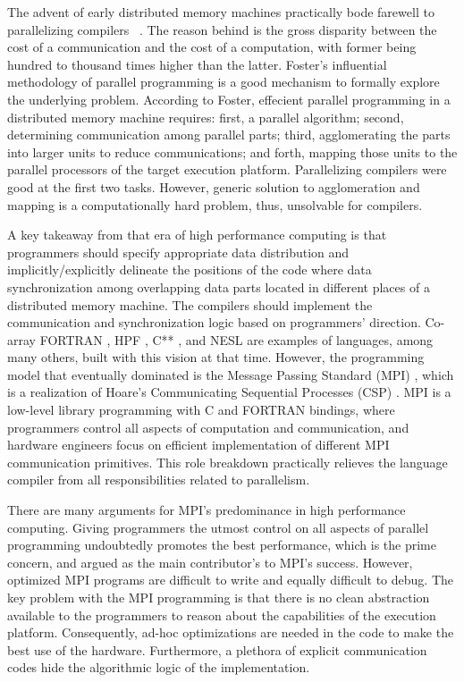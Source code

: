 \documentclass[ASNA,twocolumn]{USG} %
\begin{document}
{The advent of early distributed memory machines practically bode farewell to parallelizing compilers ~\citep{10.1145/1238844.1238851}. The reason behind is the gross disparity between the cost of a communication and the cost of a computation, with former being hundred to thousand times higher than the latter. Foster's influential methodology of parallel programming \citep{Foster:1995:DBP:527029} is a good mechanism to formally explore the underlying problem. According to Foster, effecient parallel programming in a distributed memory machine requires: first, a parallel algorithm; second, determining communication among parallel parts; third, agglomerating the parts into larger units to reduce communications; and forth, mapping those units to the parallel processors of the target execution platform. Parallelizing compilers were good at the first two tasks. However, generic solution to agglomeration and mapping is a computationally hard problem, thus, unsolvable for compilers.  
	
A key takeaway from that era of high performance computing is that programmers should specify appropriate data distribution and implicitly/explicitly delineate the positions of the code where data synchronization among overlapping data parts located in different places of a distributed memory machine. The compilers should implement the communication and synchronization logic based on programmers' direction. Co-array FORTRAN \citep{10.1145/289918.289920}, HPF \citep{219857} \citep{MEHROTRA1998325}, C** \citep{10.1007/3-540-57502-2_56}, and NESL \citep{10.5555/865114} are examples of languages, among many others, built with this vision at that time. However, the programming model that eventually dominated is the Message Passing Standard (MPI) \citep{10.1007/978-3-0348-8534-8_21}, which is a realization of Hoare's Communicating Sequential Processes (CSP) \citep{10.1145/359576.359585}. MPI is a low-level library programming with C and FORTRAN bindings, where programmers control all aspects of computation and communication, and hardware engineers focus on efficient implementation of different MPI communication primitives. This role breakdown practically relieves the language compiler from all responsibilities related to parallelism. 
	
There are many arguments for MPI's predominance in high performance computing. Giving programmers the utmost control on all aspects of parallel programming undoubtedly promotes the best performance, which is the prime concern, and argued as the main contributor's to MPI's success. However, optimized MPI programs are difficult to write and equally difficult to debug. The key problem with the MPI programming is that there is no clean abstraction available to the programmers to reason about the capabilities of the execution platform. Consequently, ad-hoc optimizations are needed in the code to make the best use of the hardware. Furthermore, a plethora of explicit communication codes hide the algorithmic logic of the implementation.
	
}
\end{document}
